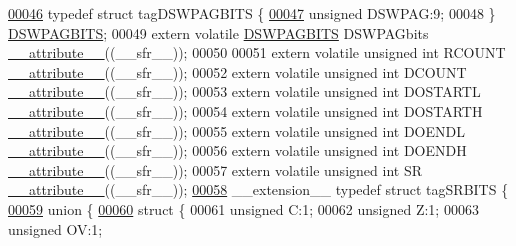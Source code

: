 \begin{DoxyCode}
\hypertarget{a00015_source_l00046}{}\hyperlink{a00014}{00046} \textcolor{keyword}{typedef} \textcolor{keyword}{struct }tagDSWPAGBITS \{
\hypertarget{a00015_source_l00047}{}\hyperlink{a00014_a3bb92d39084a37fd7cf7c826c349989d}{00047}   \textcolor{keywordtype}{unsigned} DSWPAG:9;
00048 \} \hyperlink{a00014_de/df8/a00440}{DSWPAGBITS};
00049 \textcolor{keyword}{extern} \textcolor{keyword}{volatile} \hyperlink{a00014_de/df8/a00440}{DSWPAGBITS} DSWPAGbits \hyperlink{a00015_a493c46f03454991ccc5aa7a6e1dfb2a7}{\_\_attribute\_\_}((\_\_sfr\_\_));
00050 
00051 \textcolor{keyword}{extern} \textcolor{keyword}{volatile} \textcolor{keywordtype}{unsigned} \textcolor{keywordtype}{int}  RCOUNT \hyperlink{a00015_a493c46f03454991ccc5aa7a6e1dfb2a7}{\_\_attribute\_\_}((\_\_sfr\_\_));
00052 \textcolor{keyword}{extern} \textcolor{keyword}{volatile} \textcolor{keywordtype}{unsigned} \textcolor{keywordtype}{int}  DCOUNT \hyperlink{a00015_a493c46f03454991ccc5aa7a6e1dfb2a7}{\_\_attribute\_\_}((\_\_sfr\_\_));
00053 \textcolor{keyword}{extern} \textcolor{keyword}{volatile} \textcolor{keywordtype}{unsigned} \textcolor{keywordtype}{int}  DOSTARTL \hyperlink{a00015_a493c46f03454991ccc5aa7a6e1dfb2a7}{\_\_attribute\_\_}((\_\_sfr\_\_));
00054 \textcolor{keyword}{extern} \textcolor{keyword}{volatile} \textcolor{keywordtype}{unsigned} \textcolor{keywordtype}{int}  DOSTARTH \hyperlink{a00015_a493c46f03454991ccc5aa7a6e1dfb2a7}{\_\_attribute\_\_}((\_\_sfr\_\_));
00055 \textcolor{keyword}{extern} \textcolor{keyword}{volatile} \textcolor{keywordtype}{unsigned} \textcolor{keywordtype}{int}  DOENDL \hyperlink{a00015_a493c46f03454991ccc5aa7a6e1dfb2a7}{\_\_attribute\_\_}((\_\_sfr\_\_));
00056 \textcolor{keyword}{extern} \textcolor{keyword}{volatile} \textcolor{keywordtype}{unsigned} \textcolor{keywordtype}{int}  DOENDH \hyperlink{a00015_a493c46f03454991ccc5aa7a6e1dfb2a7}{\_\_attribute\_\_}((\_\_sfr\_\_));
00057 \textcolor{keyword}{extern} \textcolor{keyword}{volatile} \textcolor{keywordtype}{unsigned} \textcolor{keywordtype}{int}  SR \hyperlink{a00015_a493c46f03454991ccc5aa7a6e1dfb2a7}{\_\_attribute\_\_}((\_\_sfr\_\_));
\hypertarget{a00015_source_l00058}{}\hyperlink{a00014}{00058} \_\_extension\_\_ \textcolor{keyword}{typedef} \textcolor{keyword}{struct }tagSRBITS \{
\hypertarget{a00015_source_l00059}{}\hyperlink{a00015}{00059}   \textcolor{keyword}{union }\{
\hypertarget{a00015_source_l00060}{}\hyperlink{a00015}{00060}     \textcolor{keyword}{struct }\{
00061       \textcolor{keywordtype}{unsigned} C:1;
00062       \textcolor{keywordtype}{unsigned} Z:1;
00063       \textcolor{keywordtype}{unsigned} OV:1;

\end{DoxyCode}
